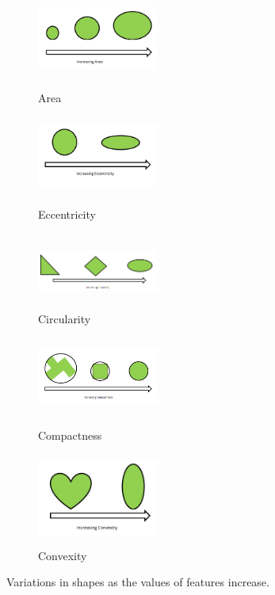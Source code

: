 \documentclass{article}
\begin{document}
\begin{figure}[!ht]
\begin{subfigure}{.5\textwidth}

\centering
        \includegraphics[width=40mm, height=25mm]{Figures/c8.png}
        \caption{\label{areshape1}Area}

\centering
        \includegraphics[width=40mm, height=25mm]{Figures/c9.png}
        \caption{\label{shape5}Eccentricity}

\centering
        \includegraphics[width=40mm, height=25mm]{Figures/c6.png}
        \caption{\label{shape3}Circularity}
        
\end{subfigure} 
\begin{subfigure}{.5\textwidth}

\centering
        \includegraphics[width=40mm, height=25mm]{Figures/c10.png}
        \caption{\label{shape4}Compactness}


\centering
        \includegraphics[width=40mm, height=30mm]{Figures/c7.png}
        \caption{\label{shape7}Convexity}
        
\end{subfigure} 

\caption{Variations in shapes as the values of features increase.}
        \end{figure}
        
\end{document}
